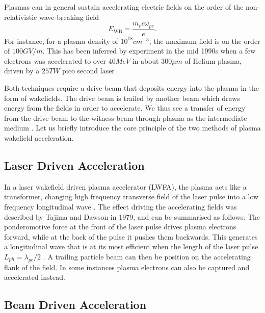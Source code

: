 Plasmas can in general sustain accelerating electric fields on the order of the non-relativistic wave-breaking field \cite{dawson:1959, esarey:1996}
\begin{equation}
    E_{\mathrm{WB}} = \frac{m_{e} c \omega_{pe}}{e}. \label{EQ:EWB}
\end{equation}
For instance, for a plasma density of $10^{18}\unit{cm}^{-3}$, the maximum field is on the order of $100\unit{GV/m}$. This has been inferred by experiment in the mid 1990s when a few electrons was accelerated to over $40\unit{MeV}$ in about $300\unit{\mu m}$ of Helium plasma, driven by a $25\unit{TW}$ pico second laser \cite{modena:1995}.

Both techniques require a drive beam that deposits energy into the plasma in the form of wakefields. The drive beam is trailed by another beam which draws energy from the fields in order to accelerate. We thus see a transfer of energy from the drive beam to the witness beam through plasma as the intermediate medium \cite{muggli:2009}. Let us briefly introduce the core principle of the two methods of plasma wakefield acceleration. 

\subsection{Laser Driven Acceleration}
\label{Int:LWFA}

In a laser wakefield driven plasma accelerator (LWFA), the plasma acts like a transformer, changing high frequency transverse field of the laser pulse into a low frequency longitudinal wave \cite{malka:2009}. The effect driving the accelerating fields was described by Tajima and Dawson in 1979, and can be summarised as follows: The ponderomotive force at the front of the laser pulse drives plasma electrons forward, while at the back of the pulse it pushes them backwards. This generates a longitudinal wave that is at its most efficient when the length of the laser pulse $L_{ph} = \lambda_{pe}/2$ \cite{tajima:1979}. A trailing particle beam can then be position on the accelerating flank of the field. In some instances plasma electrons can also be captured and accelerated instead.

\subsection{Beam Driven Acceleration}
\label{Int:BDPWFA}

